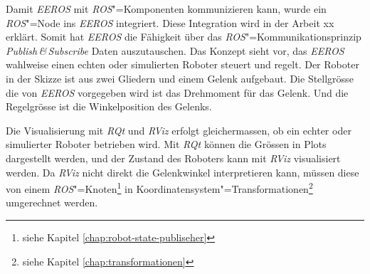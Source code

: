 Damit \textit{EEROS} mit \textit{ROS}"=Komponenten kommunizieren kann, wurde ein \textit{ROS}"=Node ins \textit{EEROS} integriert.
Diese Integration wird in der Arbeit xx erklärt. %
Somit hat \textit{EEROS} die Fähigkeit über das \textit{ROS}"=Kommunikationsprinzip \textit{Publish\,\&\,Subscribe} Daten auszutauschen.
Das Konzept sieht vor, das \textit{EEROS} wahlweise einen echten oder simulierten Roboter steuert und regelt.
Der Roboter in der Skizze ist aus zwei Gliedern und einem Gelenk aufgebaut.
Die Stellgrösse die von \textit{EEROS} vorgegeben wird ist das Drehmoment für das Gelenk.
Und die Regelgrösse ist die Winkelposition des Gelenks.

Die Visualisierung mit \textit{RQt} und \textit{RViz} erfolgt gleichermassen, ob ein echter oder simulierter Roboter betrieben wird.
Mit \textit{RQt} können die Grössen in Plots dargestellt werden, und der Zustand des Roboters kann mit \textit{RViz} visualisiert werden.
Da \textit{RViz} nicht direkt die Gelenkwinkel interpretieren kann, müssen diese von einem \textit{ROS}"=Knoten\footnote{siehe Kapitel \ref{chap:robot-state-publiseher}} in Koordinatensystem"=Transformationen\footnote{siehe Kapitel \ref{chap:transformationen}} umgerechnet werden.






